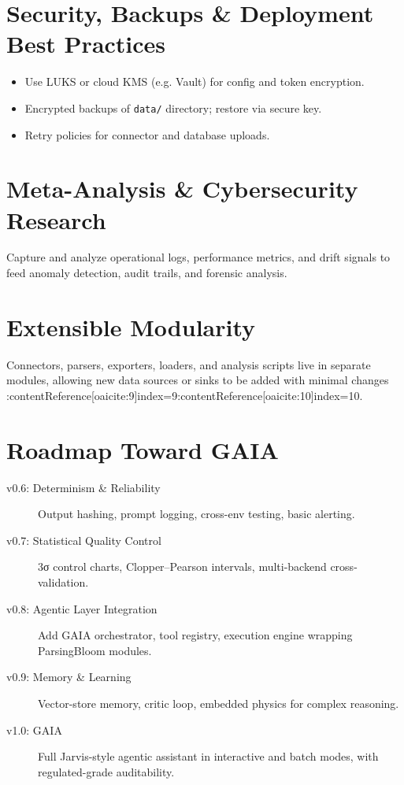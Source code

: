 \documentclass{article}
\begin{document}
	\section{Security, Backups \& Deployment Best Practices}
	\begin{itemize}
		\item Use LUKS or cloud KMS (e.g. Vault) for config and token encryption.  
		\item Encrypted backups of \texttt{data/} directory; restore via secure key.  
		\item Retry policies for connector and database uploads.  
	\end{itemize}
	
	\section{Meta-Analysis \& Cybersecurity Research}
	Capture and analyze operational logs, performance metrics, and drift signals to feed anomaly detection, audit trails, and forensic analysis.
	
	\section{Extensible Modularity}
	Connectors, parsers, exporters, loaders, and analysis scripts live in separate modules, allowing new data sources or sinks to be added with minimal changes :contentReference[oaicite:9]{index=9}:contentReference[oaicite:10]{index=10}.
	
	\section{Roadmap Toward GAIA}
	\begin{description}
		\item[v0.6: Determinism \& Reliability] Output hashing, prompt logging, cross-env testing, basic alerting.  
		\item[v0.7: Statistical Quality Control] 3σ control charts, Clopper–Pearson intervals, multi-backend cross-validation.  
		\item[v0.8: Agentic Layer Integration] Add GAIA orchestrator, tool registry, execution engine wrapping ParsingBloom modules.  
		\item[v0.9: Memory \& Learning] Vector-store memory, critic loop, embedded physics for complex reasoning.  
		\item[v1.0: GAIA] Full Jarvis-style agentic assistant in interactive and batch modes, with regulated-grade auditability.  
	\end{description}
	
\end{document}
